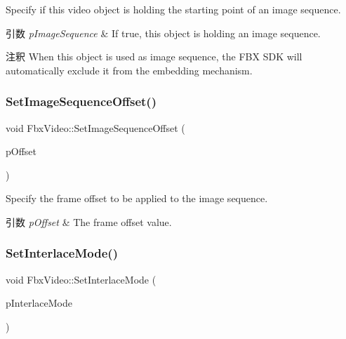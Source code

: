 Specify if this video object is holding the starting point of an image sequence. 
\begin{DoxyParams}{引数}
{\em p\+Image\+Sequence} & If {\ttfamily true}, this object is holding an image sequence. \\
\hline
\end{DoxyParams}
\begin{DoxyRemark}{注釈}
When this object is used as image sequence, the F\+BX S\+DK will automatically exclude it from the embedding mechanism. 
\end{DoxyRemark}
\mbox{\label{class_fbx_video_a32c2bbbd3fdcfc4d653e14067d92e552}} 
\subsubsection{\texorpdfstring{Set\+Image\+Sequence\+Offset()}{SetImageSequenceOffset()}}
{\footnotesize\ttfamily void Fbx\+Video\+::\+Set\+Image\+Sequence\+Offset (\begin{DoxyParamCaption}\item[{int}]{p\+Offset }\end{DoxyParamCaption})}

Specify the frame offset to be applied to the image sequence. 
\begin{DoxyParams}{引数}
{\em p\+Offset} & The frame offset value. \\
\hline
\end{DoxyParams}
\mbox{\label{class_fbx_video_aa33fec12f17da41767260e59a3165d05}} 
\subsubsection{\texorpdfstring{Set\+Interlace\+Mode()}{SetInterlaceMode()}}
{\footnotesize\ttfamily void Fbx\+Video\+::\+Set\+Interlace\+Mode (\begin{DoxyParamCaption}\item[{\hyperlink{class_fbx_video_a1e60229c28a15e29289f3f00b23aa215}{E\+Interlace\+Mode}}]{p\+Interlace\+Mode }\end{DoxyParamCaption})}

